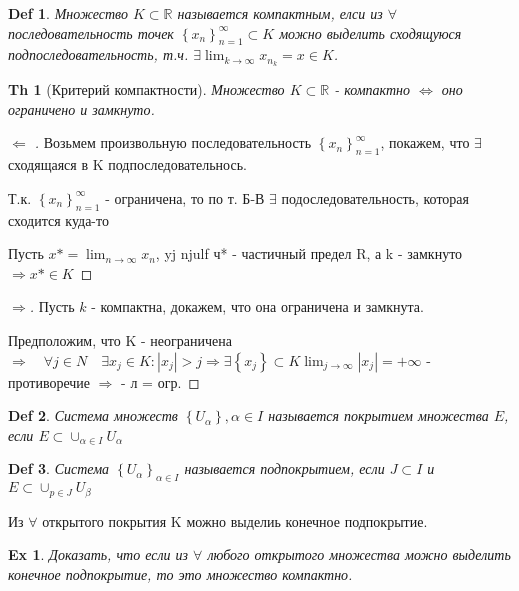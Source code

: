\documentclass[a6paper, 10pt]{article}
\theoremstyle{plain}
\newtheorem*{theorem}{Th}
\newtheorem{definition}{Def}
\newtheorem{exersise}{Ex}
\newcommand{\R}{\mathbb R}
\newcommand{\Larrow}{\Leftarrow}
\newcommand{\Rarrow}{\Rightarrow}
\newcommand{\Lrarrow}{\Leftrightarrow}
\begin{document}
    \begin{definition}
        Множество $ K \subset \R $ называется компактным, елси из $ \forall $ последовательность
        точек $ \left\{x_n \right\}_{n = 1}^{\infty} \subset K $ можно выделить сходящуюся
        подпоследовательность, т.ч. $ \exists \lim_{k \to \infty} x_{n_k} = x \in K $.
    \end{definition}

    \begin{theorem}[Критерий компактности]
        Множество $ K \subset \R $ - компактно $ \Lrarrow $ оно ограничено и замкнуто.
    \end{theorem}

    \begin{proof}[ $ \Larrow $ ]
        Возьмем произвольную последовательность $ \left\{x_n \right\}_{n = 1}^{\infty} $,
        покажем, что $ \exists  $ сходящаяся в K подпоследовательнось.

        Т.к. $ \left\{x_n \right\}_{n = 1}^{\infty} $ - ограничена, то по т. Б-В
        $ \exists $ подоследовательность, которая сходится куда-то

        Пусть $ x* = \lim_{n \to \infty} x_n $, yj njulf ч* - частичный предел R, а
        k - замкнуто $ \Rarrow x* \in K $
    \end{proof}

    \begin{proof}[ $ \Rarrow $]
        Пусть $ k $ - компактна, докажем, что она ограничена и замкнута.

        Предположим, что K - неограничена $ \Rarrow   \quad \forall j \in N \quad
        \exists x_j \in K: |x_j| > j \Rarrow \exists \left\{ x_j \right\} \subset K
        \lim_{j \to \infty} \left| x_j \right| = +\infty $ - противоречие
        $ \Rarrow  $ - л = огр.
    \end{proof}

    \begin{definition}
        Система множеств $ \left\{ U_\alpha \right\}, \alpha \in I $ называется
        покрытием множества $ E $, если $ E \subset \cup_{\alpha \in I} U_{\alpha} $
    \end{definition}

    \begin{definition}
        Система $ \left\{ U_\alpha \right\}_{\alpha \in I}  $ называется подпокрытием, если
        $ J \subset I $ и $ E \subset \cup_{p \in J} U_\beta $
    \end{definition}

    \begin{lemma}
        Из $ \forall  $ открытого покрытия K можно выделиь конечное подпокрытие.
    \end{lemma}

    \begin{exersise}
        Доказать, что если из $ \forall  $ любого открытого множества можно выделить конечное
        подпокрытие, то это множество компактно.
    \end{exersise}
\end{document}

